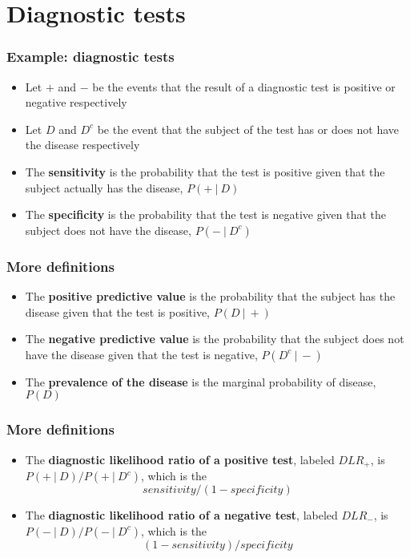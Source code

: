 \documentclass[aspectratio=169]{beamer}
\begin{document}
\section{Diagnostic tests}
\begin{frame}\frametitle{Example: diagnostic tests}
\begin{itemize}
\item Let $+$ and $-$ be the events that the result of a diagnostic test
  is positive or negative respectively
\item Let $D$ and $D^c$ be the event
  that the subject of the test has or does not have the disease
  respectively 
\item The {\bf sensitivity} is the probability that the test is
  positive given that the subject actually has the disease, $P(+ ~|~
  D)$
\item The {\bf specificity} is the probability that the test is
  negative given that the subject does not have the disease, $P(- ~|~ D^c)$
\end{itemize}
\end{frame}

\begin{frame}\frametitle{More definitions}
\begin{itemize}
   \item The {\bf positive predictive value} is the probability that the subject has the 
     disease given that the test is positive, $P(D ~|~ +)$
   \item The {\bf negative predictive value} is the probability that the subject does not have
     the disease given that the test is negative, $P(D^c ~|~ -)$
   \item The {\bf prevalence of the disease} is the marginal probability of disease, $P(D)$
\end{itemize}

\end{frame}
\begin{frame}\frametitle{More definitions}
\begin{itemize}
   \item The {\bf diagnostic likelihood ratio of a positive test}, labeled $DLR_+$, is 
     $P(+ ~|~ D) / P(+ ~|~ D^c)$, which is the $$sensitivity / (1 - specificity)$$
   \item The {\bf diagnostic likelihood ratio of a negative test},
     labeled $DLR_-$, is $P(- ~|~ D) / P(- ~|~ D^c)$, which is the
     $$(1 - sensitivity) / specificity$$
\end{itemize}
\end{frame}
\end{document}
